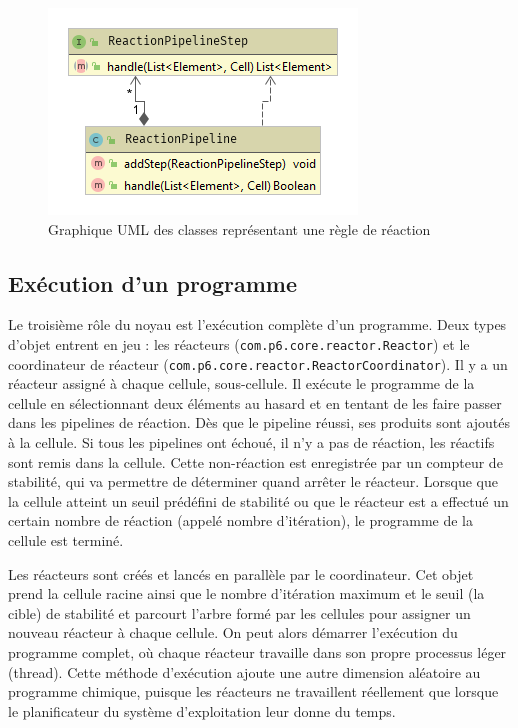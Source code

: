 \documentclass[a4paper, 12pt]{article}
\newcommand{\inline}[1]{\texttt{#1}}
\begin{document}
\begin{figure}[!ht]
  \centering
  \includegraphics[scale=0.8]{./img/Core_reaction.png}
  \caption{Graphique UML des classes représentant une règle de réaction}
\end{figure}

\subsection{Exécution d'un programme}
Le troisième rôle du noyau est l’exécution complète d’un programme. Deux types d’objet entrent en jeu : les réacteurs (\inline{com.p6.core.reactor.Reactor}) et le coordinateur de réacteur (\inline{com.p6.core.reactor.ReactorCoordinator}).
Il y a un réacteur assigné à chaque cellule, sous-cellule. Il exécute le programme de la cellule en sélectionnant deux éléments au hasard et en tentant de les faire passer dans les pipelines de réaction. Dès que le pipeline réussi, ses produits sont ajoutés à la cellule. Si tous les pipelines ont échoué, il n’y a pas de réaction, les réactifs sont remis dans la cellule. Cette non-réaction est enregistrée par un compteur de stabilité, qui va permettre de déterminer quand arrêter le réacteur. Lorsque que la cellule atteint un seuil prédéfini de stabilité ou que le réacteur est a effectué un certain nombre de réaction (appelé nombre d’itération), le programme de la cellule est terminé.

Les réacteurs sont créés et lancés en parallèle par le coordinateur. Cet objet prend la cellule racine ainsi que le nombre d’itération maximum et le seuil (la cible) de stabilité et parcourt l’arbre formé par les cellules pour assigner un nouveau réacteur à chaque cellule. On peut alors démarrer l’exécution du programme complet, où chaque réacteur travaille dans son propre processus léger (thread). Cette méthode d’exécution ajoute une autre dimension aléatoire au programme chimique, puisque les réacteurs ne travaillent réellement que lorsque le planificateur du système d’exploitation leur donne du temps.
\end{document}
